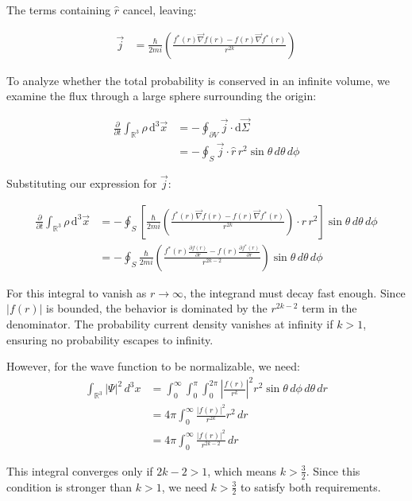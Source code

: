 \documentclass[italian]{HKNdocument}
\begin{document}
The terms containing $\hat{r}$ cancel, leaving:

\begin{align}
\vec{j} &= \frac{\hbar}{2 m i}\left(\frac{f^{*}(r) \vec{\nabla} f(r)-f(r) \vec{\nabla} f^{*}(r)}{r^{2 k}}\right)
\end{align}

To analyze whether the total probability is conserved in an infinite volume, we examine the flux through a large sphere surrounding the origin:

\begin{align}
\frac{\partial}{\partial t} \int_{\mathbb{R}^{3}} \rho \, \mathrm{d}^{3} \vec{x} &= -\oint_{\partial V} \vec{j} \cdot \mathrm{d} \vec{\Sigma} \\
&= -\oint_{S} \vec{j} \cdot \hat{r} \, r^{2} \sin\theta \, d\theta \, d\phi
\end{align}

Substituting our expression for $\vec{j}$:

\begin{align}
\frac{\partial}{\partial t} \int_{\mathbb{R}^{3}} \rho \, \mathrm{d}^{3} \vec{x} &= -\oint_{S}\left[\frac{\hbar}{2 m i}\left(\frac{f^{*}(r) \vec{\nabla} f(r)-f(r) \vec{\nabla} f^{*}(r)}{r^{2 k}}\right) \cdot \hat{r} \, r^{2}\right] \sin\theta \, d\theta \, d\phi \label{eq:1.42} \\
&= -\oint_{S} \frac{\hbar}{2 m i}\left(\frac{f^{*}(r) \frac{\partial f(r)}{\partial r}-f(r) \frac{\partial f^{*}(r)}{\partial r}}{r^{2 k-2}}\right) \sin\theta \, d\theta \, d\phi
\end{align}

For this integral to vanish as $r \to \infty$, the integrand must decay fast enough. Since $|f(r)|$ is bounded, the behavior is dominated by the $r^{2k-2}$ term in the denominator. The probability current density vanishes at infinity if $k > 1$, ensuring no probability escapes to infinity.

However, for the wave function to be normalizable, we need:
\begin{align}
\int_{\mathbb{R}^{3}} |\Psi|^2 \, d^3x &= \int_0^\infty \int_0^\pi \int_0^{2\pi} \left|\frac{f(r)}{r^k}\right|^2 r^2 \sin\theta \, d\phi \, d\theta \, dr \\
&= 4\pi \int_0^\infty \frac{|f(r)|^2}{r^{2k}} r^2 \, dr \\
&= 4\pi \int_0^\infty \frac{|f(r)|^2}{r^{2k-2}} \, dr
\end{align}

This integral converges only if $2k-2 > 1$, which means $k > \frac{3}{2}$. Since this condition is stronger than $k > 1$, we need $k > \frac{3}{2}$ to satisfy both requirements.
\end{document}
